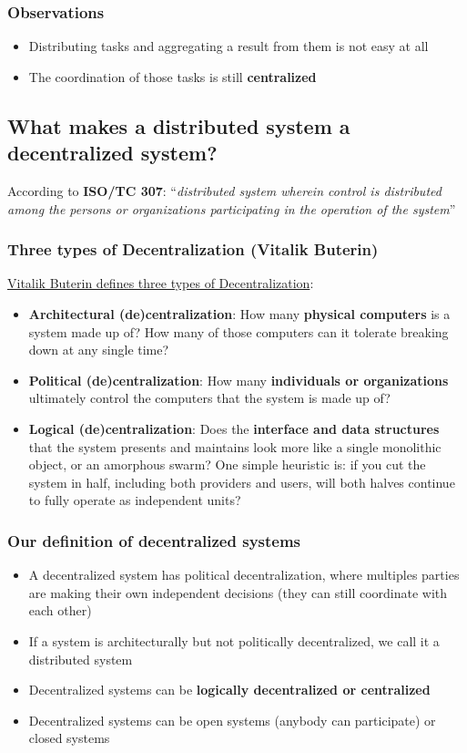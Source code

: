 \documentclass[12pt,A4]{extarticle}
\begin{document}
\subsubsection{Observations}
\begin{itemize}
  \item{Distributing tasks and aggregating a result from them is not easy at all}
  \item{The coordination of those tasks is still \textbf{centralized}}
\end{itemize}

\subsection{What makes a distributed system a decentralized system?}
According to \textbf{ISO/TC 307}: ``\textit{distributed system wherein control is distributed among the persons or organizations participating in the operation of the system}''

\subsubsection{Three types of Decentralization (Vitalik Buterin)}
\href{https://medium.com/@VitalikButerin/the-meaning-of-decentralization-a0c92b76a274}{Vitalik Buterin defines three types of Decentralization}:
\begin{itemize}
  \item{\textbf{Architectural (de)centralization}: How many \textbf{physical computers} is a system made up of? How many of those computers can it tolerate breaking down at any single time?}
  \item{\textbf{Political (de)centralization}: How many \textbf{individuals or organizations} ultimately control the computers that the system is made up of?}
  \item{\textbf{Logical (de)centralization}: Does the \textbf{interface and data structures} that the system presents and maintains look more like a single monolithic object, or an amorphous swarm? One simple heuristic is: if you cut the system in half, including both providers and users, will both halves continue to fully operate as independent units?}
\end{itemize}

\subsubsection{Our definition of decentralized systems}
\begin{itemize}
  \item{A decentralized system has political decentralization, where multiples parties are making their own independent decisions (they can still coordinate with each other)}
  \item{If a system is architecturally but not politically decentralized, we call it a distributed system}
  \item{Decentralized systems can be \textbf{logically decentralized or centralized}}
  \item{Decentralized systems can be open systems (anybody can participate) or closed systems}
\end{itemize}
\end{document}
